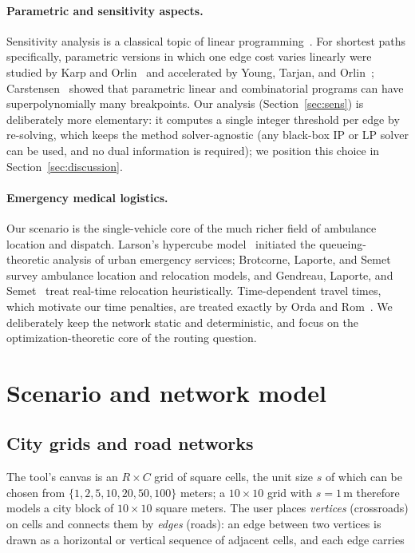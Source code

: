 \documentclass[10pt,twocolumn]{article}
\begin{document}
\paragraph{Parametric and sensitivity aspects.}
Sensitivity analysis is a classical topic of linear programming~\cite{gass85}. For shortest
paths specifically, parametric versions in which one edge cost varies linearly were studied
by Karp and Orlin~\cite{karporlin81} and accelerated by Young, Tarjan, and
Orlin~\cite{youngtarjanorlin91}; Carstensen~\cite{carstensen83} showed that parametric linear
and combinatorial programs can have superpolynomially many breakpoints. Our analysis
(Section~\ref{sec:sens}) is deliberately more elementary: it computes a single integer
threshold per edge by re-solving, which keeps the method solver-agnostic (any black-box IP
or LP solver can be used, and no dual information is required); we position this choice in
Section~\ref{sec:discussion}.

\paragraph{Emergency medical logistics.}
Our scenario is the single-vehicle core of the much richer field of ambulance location and
dispatch. Larson's hypercube model~\cite{larson74} initiated the queueing-theoretic
analysis of urban emergency services; Brotcorne, Laporte, and Semet~\cite{brotcorne03}
survey ambulance location and relocation models, and Gendreau, Laporte, and
Semet~\cite{gendreau01} treat real-time relocation heuristically. Time-dependent travel
times, which motivate our time penalties, are treated exactly by Orda and
Rom~\cite{ordarom90}. We deliberately keep the network static and deterministic, and focus
on the optimization-theoretic core of the routing question.

\section{Scenario and network model}
\label{sec:model}

\subsection{City grids and road networks}

The tool's canvas is an $R\times C$ grid of square cells, the unit size $s$ of which can be
chosen from $\{1,2,5,10,20,50,100\}$ meters; a $10\times10$ grid with $s=1$\,m therefore
models a city block of $10\times10$ square meters. The user places \emph{vertices}
(crossroads) on cells and connects them by \emph{edges} (roads): an edge between two
vertices is drawn as a horizontal or vertical sequence of adjacent cells, and each edge
carries
\end{document}
